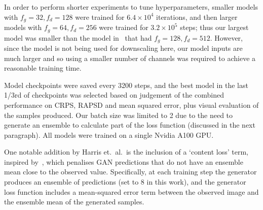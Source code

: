 \documentclass{article}
\begin{document}
 In order to perform shorter experiments to tune hyperparameters, smaller models with $f_g=32, f_d=128$ were trained for $6.4\times 10^4$ iterations, and then larger models with $f_g=64, f_d=256$ were trained for $3.2\times10^5$ steps; thus our largest model was smaller than the model in~\cite{harris_generative_2022} that had $f_g=128, f_d=512$. However, since the model is not being used for downscaling here, our model inputs are much larger and so using a smaller number of channels was required to achieve a reasonable training time. 

 
 Model checkpoints were saved every 3200 steps, and the best model in the last 1/3rd of checkpoints was selected based on judgement of the combined performance on CRPS, RAPSD and mean squared error, plus visual evaluation of the samples produced. Our batch size was limited to 2 due to the need to generate an ensemble to calculate part of the loss function (discussed in the next paragraph). All models were trained on a single Nvidia A100 GPU.

One notable addition by Harris et.~al.~is the inclusion of a `content loss' term, inspired by~\cite{ravuri_skilful_2021}, which penalises GAN predictions that do not have an ensemble mean close to the observed value. Specifically, at each training step the generator produces an ensemble of predictions (set to 8 in this work), and the generator loss function includes a mean-squared error term between the observed image and the ensemble mean of the generated samples.

\end{document}
